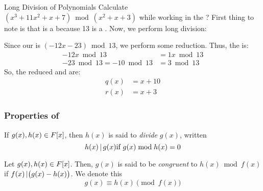 \begin{example}[Lecture 3]{Long Division of Polynomials}
  Calculate $\left( x^{3} + 11x^{2} + x + 7 \right) \bmod \left( x^{2} + x + 3 \right)$ while working in the  ?
  \tcblower{}
  First thing to note is that  is a  because 13 is a .
  Now, we perform long division:

  \begin{center}
  \end{center}

  Since our  is $(-12x - 23) \bmod 13$, we perform some reduction.
  Thus, the  is:
  \begin{align*}
    -12x \bmod 13 &= 1x \bmod 13 \\
    -23 \bmod 13 = -10 \bmod 13 &= 3 \bmod 13
  \end{align*}
  So, the reduced  and  are:
  \begin{align*}
    q(x) &= x + 10 \\
    r(x) &= x + 3
  \end{align*}
\end{example}

\subsubsection{Properties of }\label{subsubsec:Polynomial_Ring_Properties}
\begin{definition}[Divide]\label{def:Polynomial_Ring_Properties-Divide}
  If $g(x), h(x) \in F[x]$, then $h(x)$ is said to \emph{divide} $g(x)$, written
  \begin{equation}\label{eq:Polynomial_Ring_Properties-Divide}
    h(x) \operatorname{\vert} g(x) \text{if } g(x) \bmod h(x) = 0
  \end{equation}
\end{definition}

\begin{definition}[Congruent]\label{def:Polynomial_Ring_Properties-Congruent}
  Let $g(x), h(x) \in F[x]$.
  Then, $g(x)$ is said to be \emph{congruent} to $h(x) \bmod f(x)$ if $f(x) \operatorname{\vert} \bigl( g(x) - h(x) \bigr)$.
  We denote this
  \begin{equation}\label{eq:Polynomial_Ring_Properties-Congruent}
    g(x) \equiv h(x) \pmod{f(x)}
  \end{equation}
\end{definition}

